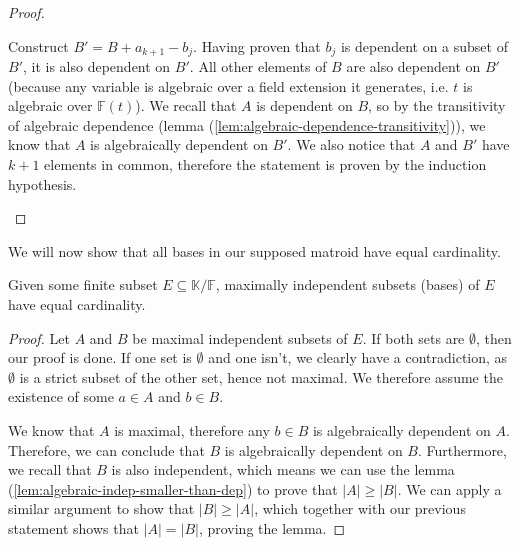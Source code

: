 \begin{proof}
\begin{enumerate}
		      Construct $B' = B + a _{k + 1} - b_j$. Having proven that $b_j$ is dependent on a subset of $B'$, it is also dependent on $B'$. All other elements of $B$ are also dependent on $B'$ (because any variable is algebraic over a field extension it generates, i.e. $t$ is algebraic over $\mathbb F(t)$). We recall that $A$ is dependent on $B$, so by the transitivity of algebraic dependence (lemma (\ref{lem:algebraic-dependence-transitivity})), we know that $A$ is algebraically dependent on $B'$. We also notice that $A$ and $B'$ have $k + 1$ elements in common, therefore the statement is proven by the induction hypothesis.
	\end{enumerate}
\end{proof}

We will now show that all bases in our supposed matroid have equal cardinality.

\begin{lemma}\label{lem:algebraic-matroid-equal-size-bases}
	Given some finite subset $E \subseteq \mathbb K / \mathbb F$, maximally independent subsets (bases) of $E$ have equal cardinality.
\end{lemma}

\begin{proof}
	Let $A$ and $B$ be maximal independent subsets of $E$. If both sets are $\emptyset$, then our proof is done. If one set is $\emptyset$ and one isn't, we clearly have a contradiction, as $\emptyset$ is a strict subset of the other set, hence not maximal. We therefore assume the existence of some $a \in A$ and $b \in B$.

	We know that $A$ is maximal, therefore any $b \in B$ is algebraically dependent on $A$. Therefore, we can conclude that $B$ is algebraically dependent on $B$. Furthermore, we recall that $B$ is also independent, which means we can use the lemma (\ref{lem:algebraic-indep-smaller-than-dep}) to prove that $|A| \geq |B|$. We can apply a similar argument to show that $|B| \geq |A|$, which together with our previous statement shows that $|A| = |B|$, proving the lemma.
\end{proof}

